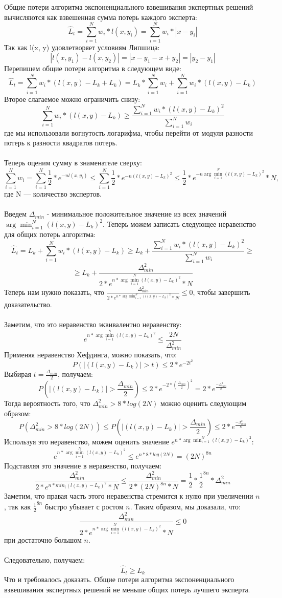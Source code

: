 \documentclass{article}
\begin{document}
Общие потери алгоритма экспоненциального взвешивания экспертных решений вычисляются как взвешенная сумма потерь каждого эксперта:
$$
\hat{L}_t = \sum_{i=1}^N w_i*l(x,y_i) = \sum_{i=1}^N w_i*|x-y_i|
$$
Так как l(x, y) удовлетворяет условиям Липшица:
$$
|l(x,y_1)-l(x,y_2)| = |x-y_1-x+y_2| = |y_2-y_1|
$$
Перепишем общие потери алгоритма в следующем виде:
$$
\hat{L}_t = \sum_{i=1}^N w_i*(l(x,y)-L_k+L_k) = L_k*\sum_{i=1}^N w_i+\sum_{i=1}^N w_i*(l(x,y)-L_k)
$$
Второе слагаемое можно ограничить снизу:
$$
\sum_{i=1}^N w_i*(l(x,y)-L_k) \geq \frac{\sum_{i=1}^N w_i*(l(x,y)-L_k)^2}{\sum_{i=1}^N w_i}
$$
где мы использовали вогнутость логарифма, чтобы перейти от модуля разности потерь к разности квадратов потерь. \\\\
Теперь оценим сумму в знаменателе сверху:
$$
\sum_{i=1}^N w_i=\sum_{i=1}^N \frac{1}{2}*e^{-nl(x,y_i)}
\leq \sum_{i=1}^N \frac{1}{2}*e^{-n(l(x,y)-L_k)^2}
\leq \frac{1}{2}*e^{-n\arg\min_{i=1}^N (l(x,y)-L_k)^2}*N,
$$
где N — количество экспертов.\\\\
Введем $\Delta_{min}$ - минимальное положительное значение из всех значений $\arg\min_{i=1}^N (l(x,y)-L_k)^2$.
Теперь можем записать следующее неравенство для общих потерь алгоритма:
$$
\hat{L}_t = L_k + \sum_{i=1}^N w_i * (l(x,y)-L_k) \geq L_k + \frac{\sum_{i=1}^N w_i * (l(x,y)-L_k)^2}{\sum_{i=1}^N w_i} \geq
$$
$$
\geq L_k + \frac{\Delta_{min}^2}{2 * e^{n * \arg\min_{i=1}^N (l(x,y)-L_k)^2} * N}
$$
Теперь нам нужно показать, что $\frac{\Delta_{min}^2}{2 * e^{n * \arg\min_{i=1}^N (l(x,y)-L_k)^2} * N} \leq 0$, чтобы завершить доказательство. \\\\
Заметим, что это неравенство эквивалентно неравенству:
$$
e^{n * \arg\min_{i=1}^N (l(x,y)-L_k)^2} \leq \frac{2N}{\Delta_{min}^2}
$$
Применяя неравенство Хефдинга, можно показать, что:
$$
P(|(l(x,y)-L_k)| > t) \leq 2 * e^{-2t^2}
$$
Выбирая $t = \frac{\Delta_{min}}{2}$, получаем:
$$
P(|(l(x,y)-L_k)| > \frac{\Delta_{min}}{2}) \leq 2 * e^{-2 * (\frac{\Delta_{min}}{2})^2} = 2 * e^{\frac{-\Delta_{min}^2}{8}}
$$
Тогда вероятность того, что $\Delta_{min}^2 > 8 * log(2N)$ можно оценить следующим образом:
$$
P(\Delta_{min}^2 > 8 * log(2N)) \leq P(|(l(x,y)-L_k)| > \frac{\Delta_{min}}{2}) \leq 2 * e^{\frac{-\Delta_{min}^2}{8}}
$$
Используя это неравенство, можем оценить значение $e^{n * \arg\min_{i=1}^N (l(x,y)-L_k)^2}$:
$$
e^{n * \arg\min_{i=1}^N (l(x,y)-L_k)^2} \leq e^{n * 8 * log(2N)} = (2N)^{8n}
$$
Подставляя это значение в неравенство, получаем:
$$
\frac{\Delta_{min}^2}{2 * e^{n * min_i (l(x,y)-L_k)^2} * N} \leq \frac{\Delta_{min}^2}{2 * (2N)^{8n} * N}
= \frac{1}{2} * \frac{1}{2}^{8n} * \Delta_{min}^2
$$
Заметим, что правая часть этого неравенства стремится к нулю при увеличении $n$, так как $\frac{1}{2}^{8n}$ быстро убывает с ростом $n$. Таким образом, мы доказали, что:
$$
\frac{\Delta_{min}^2}{2 * e^{n * \arg\min_{i=1}^N (l(x,y)-L_k)^2} * N} \leq 0
$$
при достаточно большом $n$.\\\\
Следовательно, получаем:
$$
\hat{L}_t \geq L_k
$$
Что и требовалось доказать. Общие потери алгоритма экспоненциального взвешивания экспертных решений не меньше общих потерь лучшего эксперта.
\end{document}
